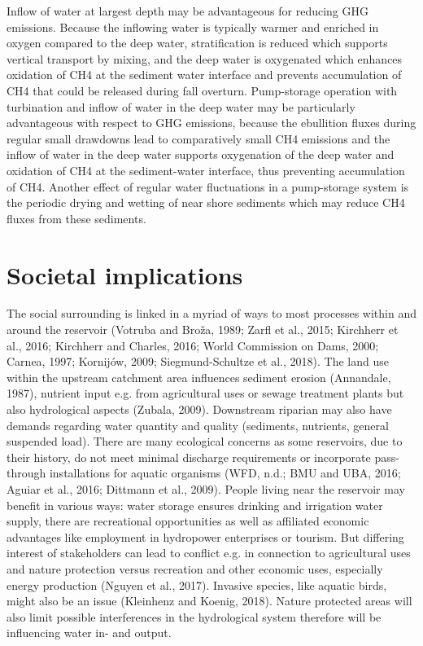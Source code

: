 Inflow of water at largest depth may be advantageous for reducing GHG emissions. Because the inflowing water is typically warmer and enriched in oxygen compared to the deep water, stratification is reduced which supports vertical transport by mixing, and the deep water is oxygenated which enhances oxidation of CH4 at the sediment water interface and prevents accumulation of CH4 that could be released during fall overturn.  
Pump-storage operation with turbination and inflow of water in the deep water may be particularly advantageous with respect to GHG emissions, because the ebullition fluxes during regular small drawdowns lead to comparatively small CH4 emissions and the inflow of water in the deep water supports oxygenation of the deep water and oxidation of CH4 at the sediment-water interface, thus preventing accumulation of CH4. Another effect of regular water fluctuations in a pump-storage system is the periodic drying and wetting of near shore sediments which may reduce CH4 fluxes from these sediments.
\section{Societal implications}
\label{sec:1}
The social surrounding is linked in a myriad of ways to most processes within and around the reservoir (Votruba and Broža, 1989; Zarfl et al., 2015; Kirchherr et al., 2016; Kirchherr and Charles, 2016; World Commission on Dams, 2000; Carnea, 1997; Kornijów, 2009; Siegmund-Schultze et al., 2018). The land use within the upstream catchment area influences sediment erosion (Annandale, 1987), nutrient input e.g. from agricultural uses or sewage treatment plants but also hydrological aspects (Zubala, 2009). Downstream riparian may also have demands regarding water quantity and quality (sediments, nutrients, general suspended load). There are many ecological concerns as some reservoirs, due to their history, do not meet minimal discharge requirements or incorporate pass-through installations for aquatic organisms (WFD, n.d.; BMU and UBA, 2016; Aguiar et al., 2016; Dittmann et al., 2009). People living near the reservoir may benefit in various ways: water storage ensures drinking and irrigation water supply, there are recreational opportunities as well as affiliated economic advantages like employment in hydropower enterprises or tourism. But differing interest of stakeholders can lead to conflict e.g. in connection to agricultural uses and nature protection versus recreation and other economic uses, especially energy production (Nguyen et al., 2017). Invasive species, like aquatic birds, might also be an issue (Kleinhenz and Koenig, 2018). Nature protected areas will also limit possible interferences in the hydrological system therefore will be influencing  water in- and output.
